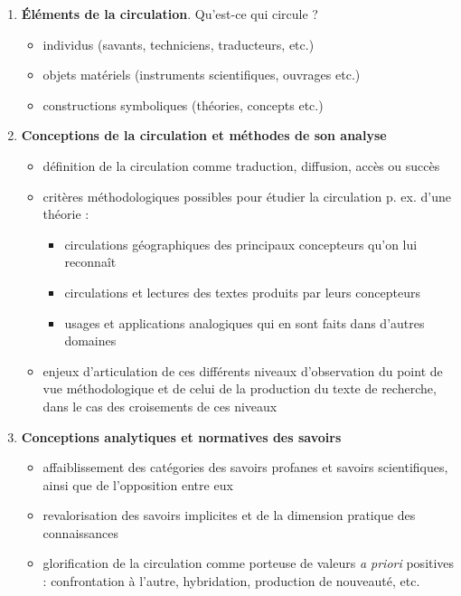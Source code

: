 \begin{enumerate}
    \item \textbf{Éléments de la circulation}. Qu'est-ce qui circule ? 
    \begin{itemize}
        \item individus (savants, techniciens, traducteurs, etc.)
        \item objets matériels (instruments scientifiques, ouvrages etc.)
        \item constructions symboliques (théories, concepts etc.)
    \end{itemize}  
    \item \textbf{Conceptions de la circulation et méthodes de son analyse}
    \begin{itemize}
        \item définition de la circulation comme \og{}traduction\fg{}, \og{}diffusion\fg{}, \og{}accès\fg{} ou \og{}succès\fg{}
        \item critères méthodologiques possibles pour étudier la circulation p. ex. d'une théorie : 
        \begin{itemize}
            \item circulations géographiques des principaux concepteurs qu'on lui reconnaît
            \item circulations et lectures des textes produits par leurs concepteurs  
            \item usages et applications analogiques qui en sont faits dans d'autres domaines
        \end{itemize} 
        \item enjeux d'articulation de ces différents niveaux d'observation du point de vue méthodologique et de celui de la production du texte de recherche, dans le cas des croisements de ces niveaux
    \end{itemize}
    \item \textbf{Conceptions analytiques et normatives des savoirs}
    \begin{itemize}
        \item affaiblissement des catégories des \og{}savoirs profanes\fg{} et \og{}savoirs scientifiques\fg{}, ainsi que de l'opposition entre eux
        \item revalorisation des savoirs implicites et de la dimension pratique des connaissances
        \item glorification de la circulation comme porteuse de valeurs \textit{a priori} positives : confrontation à l'autre, hybridation, production de nouveauté, etc.
    \end{itemize}
\end{enumerate}

